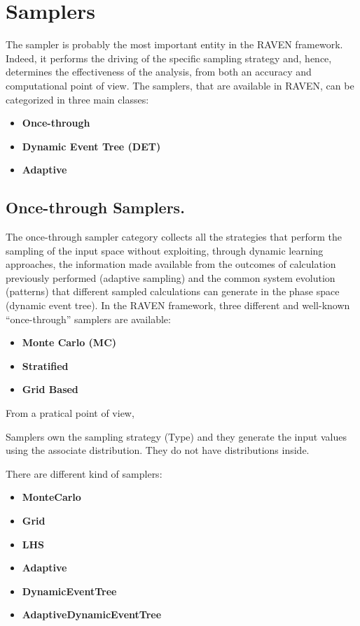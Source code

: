 \section{Samplers  \\ \vspace{2 mm} {\small }}
\label{sec:Samplers}
The sampler is probably the most important entity in the RAVEN framework. Indeed, it performs the driving of the specific sampling strategy and, hence, determines the effectiveness of the analysis, from both an accuracy and computational point of view.  The samplers, that are available in RAVEN, can be categorized in three main classes:
\begin{itemize}
\item \textbf{Once-through}
\item \textbf{Dynamic Event Tree (DET)}
\item \textbf{Adaptive}
\end{itemize}
\subsection{Once-through Samplers.}
The once-through sampler category collects all the strategies that perform the sampling of the input space without exploiting, through dynamic learning approaches, the information made available from the outcomes of calculation previously performed (adaptive sampling) and the common system evolution (patterns) that different sampled calculations can generate in the phase space (dynamic event tree). 
In the RAVEN framework, three different and well-known “once-through” samplers are available: 
\begin{itemize}
\item \textbf{Monte Carlo (MC)}
\item \textbf{Stratified}
\item \textbf{Grid Based}
\end{itemize}
From a pratical point of view, 







Samplers own the sampling strategy (Type) and they generate the input values using the associate distribution. They do not have distributions inside.

There are different kind of samplers:
\begin{itemize}
\item \textbf{MonteCarlo}
\item \textbf{Grid}
\item \textbf{LHS}
\item \textbf{Adaptive}
\item \textbf{DynamicEventTree}
\item \textbf{AdaptiveDynamicEventTree}
\end{itemize}

